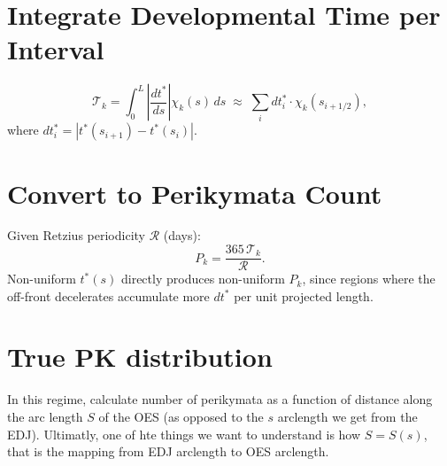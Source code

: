 \documentclass[11pt]{article}
\begin{document}
\section{Integrate Developmental Time per Interval}

\begin{equation}
    \mathcal{T}_k
    =
    \int_0^L \left|\frac{dt^*}{ds}\right| \chi_k(s)\, ds
    \;\approx\;
    \sum_i dt^*_i \cdot \chi_k(s_{i+1/2}),
\end{equation}
where $dt^*_i = |t^*(s_{i+1}) - t^*(s_i)|$.

\section{Convert to Perikymata Count}

Given Retzius periodicity $\mathcal{R}$ (days):
\begin{equation}
    P_k = \frac{365\,\mathcal{T}_k}{\mathcal{R}}.
\end{equation}
Non-uniform $t^*(s)$ directly produces non-uniform $P_k$, since regions where the off-front
decelerates accumulate more $dt^*$ per unit projected length.

\section{True PK distribution}

In this regime, calculate number of perikymata as a function of distance along the arc length $S$ of the OES (as opposed to the $s$ arclength we get from the EDJ). Ultimatly, one of hte things we want to understand is how $S = S(s)$, that is the mapping from EDJ arclength to OES arclength. 
\end{document}
